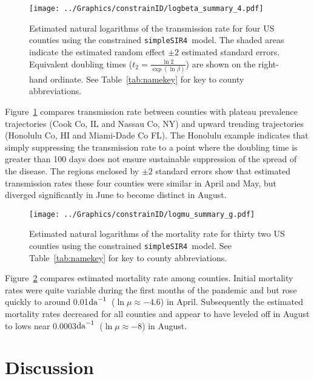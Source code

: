\documentclass[12pt,letterpaper]{article}
\newcommand\perda{$\rm{da}^{-1}$}
\newcommand\SSm{{\tt simpleSIR4}}
\begin{document}
{\begin{figure}[!h]
\begin{center}
\texttt{[image: ../Graphics/constrainID/logbeta\_summary\_4.pdf]}\\
\end{center}
\caption{\label{fig:xrates2}
Estimated natural logarithms of the transmission rate for four US
counties using the constrained \SSm\ model.
The shaded areas indicate the estimated random effect $\pm 2$
estimated standard errors.
Equivalent doubling times ($t_2 = \frac{\ln 2}{\exp(\ln \beta)}$)
are shown on the right-hand ordinate.
See Table~\ref{tab:namekey} for key to county abbreviations.
}
\end{figure}

Figure~\ref{fig:xrates2} compares transmission rate between counties
with plateau prevalence trajectories (Cook Co, IL and Nassau Co, NY) and
upward  trending trajectories (Honolulu Co, HI and Miami-Dade Co
FL). The Honolulu example indicates that simply suppressing the
transmission rate to a point where the doubling time is greater than
100 days does not ensure sustainable suppression of the spread of the
disease. The regions enclosed
by $\pm 2$ standard errors show that estimated transmission rates
these four counties were similar in April and May, but diverged
significantly in June to become distinct in August.

\begin{figure}[!h]
\begin{center}
\texttt{[image: ../Graphics/constrainID/logmu\_summary\_g.pdf]}\\
\end{center}
\caption{\label{fig:drates}
Estimated natural logarithms of the mortality rate for thirty two US
counties using the constrained \SSm\ model.
See Table~\ref{tab:namekey} for key to county abbreviations.
}
\end{figure}

Figure~\ref{fig:drates} compares estimated mortality rate among
counties. Initial mortality rates were quite variable during the first
months of the pandemic and but rose quickly to around 
0.01\perda\ ($\ln \mu \approx -4.6$) in April. Subsequently the
estimated mortality rates decreased for all counties and appear to
have leveled off in August to lows near
0.0003\perda\ ($\ln \mu \approx -8$) in August.

\section*{Discussion}

}
\end{document}
